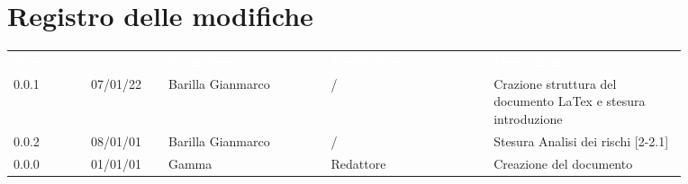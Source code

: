 \section*{Registro delle modifiche}

{\renewcommand{\arraystretch}{1.5}
\begin{tabular}{p{0.10\linewidth}p{0.10\linewidth}p{0.21\linewidth}p{0.21\linewidth}p{0.25\linewidth}}
	\rowcolor[RGB]{33, 73, 50}
	\textcolor{white}{\textbf{Versione}} & \textcolor{white}{\textbf{Data}} & \textcolor{white}
	{\textbf{Redattore}} & \textcolor{white}{\textbf{Verificatore}} & \textcolor{white}
	{\textbf{Descrizione}}\\
	\rowcolor[RGB]{216, 235, 171}
	0.0.1 & 07/01/22 & Barilla Gianmarco & / & Crazione struttura del documento LaTex e stesura introduzione\\
	\rowcolor[RGB]{233, 245, 206}
	0.0.2 & 08/01/01 & Barilla Gianmarco & / & Stesura Analisi dei rischi [2-2.1]\\
	\rowcolor[RGB]{216, 235, 171}
	0.0.0 & 01/01/01 & Gamma & Redattore & Creazione del documento\\
	
\end{tabular}	
}